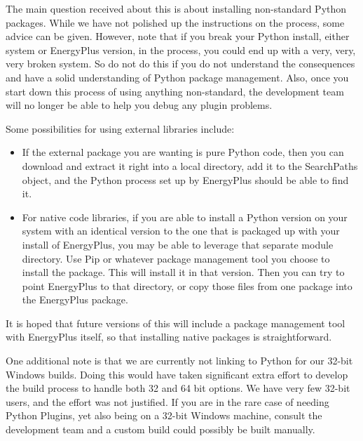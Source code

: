 The main question received about this is about installing non-standard Python packages.
While we have not polished up the instructions on the process, some advice can be given.
However, note that if you break your Python install, either system or EnergyPlus version, in the process, you could end up with a very, very, very broken system.
So do not do this if you do not understand the consequences and have a solid understanding of Python package management.
Also, once you start down this process of using anything non-standard, the development team will no longer be able to help you debug any plugin problems.

Some possibilities for using external libraries include:
\begin{itemize}
    \item If the external package you are wanting is pure Python code, then you can download and extract it right into a local directory, add it to the SearchPaths object, and the Python process set up by EnergyPlus should be able to find it.
    \item For native code libraries, if you are able to install a Python version on your system with an identical version to the one that is packaged up with your install of EnergyPlus, you may be able to leverage that separate module directory.
          Use Pip or whatever package management tool you choose to install the package.
          This will install it in that version.
          Then you can try to point EnergyPlus to that directory, or copy those files from one package into the EnergyPlus package.
\end{itemize}

It is hoped that future versions of this will include a package management tool with EnergyPlus itself, so that installing native packages is straightforward.

One additional note is that we are currently not linking to Python for our 32-bit Windows builds.
Doing this would have taken significant extra effort to develop the build process to handle both 32 and 64 bit options.
We have very few 32-bit users, and the effort was not justified.
If you are in the rare case of needing Python Plugins, yet also being on a 32-bit Windows machine, consult the development team and a custom build could possibly be built manually.

